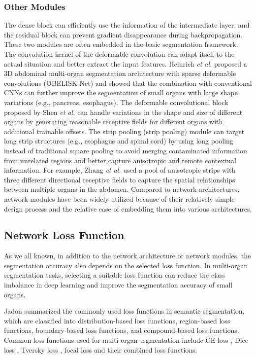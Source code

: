 \documentclass[lettersize,journal]{IEEEtran}
\begin{document}
\subsubsection{Other Modules}
The dense block \cite{171} can efficiently use the information of the intermediate layer, and the residual block \cite{172} can prevent gradient disappearance during backpropagation. These two modules are often embedded in the basic segmentation framework. The convolution kernel of the deformable convolution \cite{173} can adapt itself to the actual situation and better extract the input features. Heinrich {\it{et al.}} \cite{63} proposed a 3D abdominal multi-organ segmentation architecture with sparse deformable convolutions (OBELISK-Net) and showed that the combination with conventional CNNs can further improve the segmentation of small organs with large shape variations (e.g., pancreas, esophagus). The deformable convolutional block proposed by Shen {\it{et al.}} \cite{80} can handle variations in the shape and size of different organs by generating reasonable receptive fields for different organs with additional trainable offsets. The strip pooling (strip pooling) \cite{174} module can target long strip structures (e.g., esophagus and spinal cord) by using long pooling instead of traditional square pooling to avoid merging contaminated information from unrelated regions and better capture anisotropic and remote contextual information. For example, Zhang {\it{et al.}} \cite{131} used a pool of anisotropic strips with three different directional receptive fields to capture the spatial relationships between multiple organs in the abdomen. Compared to network architectures, network modules have been widely utilized because of their relatively simple design process and the relative ease of embedding them into various architectures.

\subsection{Network Loss Function}
\label{sec4_4}
As we all known, in addition to the network architecture or network modules, the segmentation accuracy also depends on the selected loss function. In multi-organ segmentation tasks, selecting a suitable loss function can reduce the class imbalance in deep learning and improve the segmentation accuracy of small organs.

Jadon \cite{175} summarized the commonly used loss functions in semantic segmentation, which are classified into distribution-based loss functions, region-based loss functions, boundary-based loss functions, and compound-based loss functions. Common loss functions used for multi-organ segmentation include CE loss \cite{176}, Dice loss \cite{177}, Tversky loss \cite{178}, focal loss \cite{179} and their combined loss functions.
\end{document}
